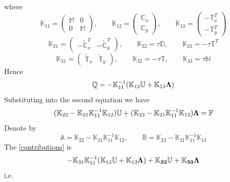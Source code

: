 \documentclass[10pt,reqno, final]{amsart}
\begin{document}
where
\begin{equation}
\mathbb{K}_{11}=\begin{pmatrix}
\mathbb{M} & 0\\
0 & \mathbb{M}
\end{pmatrix},\qquad
\mathbb{K}_{12}=\begin{pmatrix}
\mathbb{C}_x\\
\mathbb{C}_y
\end{pmatrix}
,\qquad
\mathbb{K}_{13}=\begin{pmatrix}
-\mathbb{T}^T_x\\
-\mathbb{T}^T_y
\end{pmatrix}
\end{equation}
\begin{equation}
\mathbb{K}_{21}=\begin{pmatrix}
-\tilde{\mathbb{C}}_x^T& -\tilde{\mathbb{C}}_y^T
\end{pmatrix},\qquad
\mathbb{K}_{22}=\tau\mathbb{D},\qquad
\mathbb{K}_{23}=-\tau\mathbb{T}^T
\end{equation}
\begin{equation}
\mathbb{K}_{31}=\begin{pmatrix}
\tilde{\mathbb{T}}_x & \tilde{\mathbb{T}}_y
\end{pmatrix},\qquad
\mathbb{K}_{32}=-\tau\mathbb{T},\qquad
\mathbb{K}_{33}=\tau\mathbb{N}
\end{equation}
Hence
\begin{equation}
\mathbb{Q}=-\mathbb{K}_{11}^{-1}(\mathbb{K}_{12}\mathbb{U}+\mathbb{K}_{13}\bf\Lambda)
\end{equation}
Substituting into the second equation we have
\begin{equation}
(\mathbb{K}_{22}-\mathbb{K}_{21}\mathbb{K}_{11}^{-1}\mathbb{K}_{12})\mathbb{U}+(\mathbb{K}_{23}-\mathbb{K}_{21}\mathbb{K}_{11}^{-1}\mathbb{K}_{13})\bf\Lambda=\mathbb{F}
\end{equation}
Denote by
\begin{equation}
\mathbb{A}=\mathbb{K}_{22}-\mathbb{K}_{21}\mathbb{K}_{11}^{-1}\mathbb{K}_{12},\qquad
\mathbb{B}=\mathbb{K}_{23}-\mathbb{K}_{21}\mathbb{K}_{11}^{-1}\mathbb{K}_{13}
\end{equation}
The \eqref{contributions} is
\begin{equation}
-\mathbb{K}_{31}\mathbb{K}_{11}^{-1}(\mathbb{K}_{12}\mathbb{U}+\mathbb{K}_{13}\bf\Lambda)+\mathbb{K}_{32}\mathbb{U}+\mathbb{K}_{33}\Lambda
\end{equation}
i.e.
\end{document}
